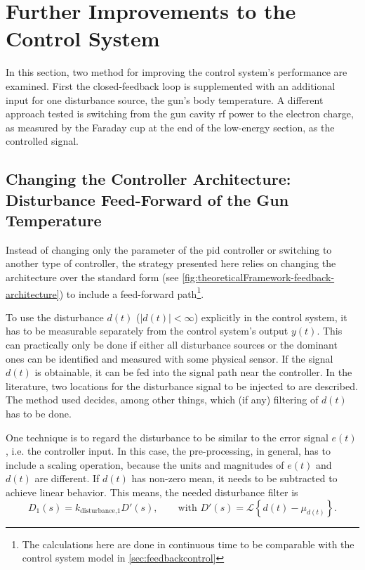 \section{Further Improvements to the Control System}
In this section, two method for improving the control system's performance are examined. First the closed-feedback loop is supplemented with an additional input for one disturbance source, the gun's body temperature. A different approach tested is switching from the gun cavity \gls{rf} power to the electron charge, as measured by the Faraday cup at the end of the low-energy section, as the controlled signal.

\subsection{Changing the Controller Architecture: Disturbance Feed-Forward of the Gun Temperature}
Instead of changing only the parameter of the \gls{pid} controller or switching to another type of controller, the strategy presented here relies on changing the architecture over the standard form (see \autoref{fig:theoreticalFramework-feedback-architecture}) to include a feed-forward path\footnote{The calculations here are done in continuous time to be comparable with the control system model in \autoref{sec:feedbackcontrol}}.

To use the disturbance $d(t)$ ($|d(t)|<\infty$) explicitly in the control system, it has to be measurable separately from the control system's output $y(t)$. This can practically only be done if either all disturbance sources or the dominant ones can be identified and measured with some physical sensor. If the signal $d(t)$ is obtainable, it can be fed into the signal path near the controller. In the literature, two locations for the disturbance signal to be injected to are described. The method used decides, among other things, which (if any) filtering of $d(t)$ has to be done.

One technique is to regard the disturbance to be similar to the error signal $e(t)$, i.e. the controller input. \cite{Brosilow2002} In this case, the pre-processing, in general, has to include a scaling operation, because the units and magnitudes of $e(t)$ and $d(t)$ are different. If $d(t)$ has non-zero mean, it needs to be subtracted to achieve linear behavior. This means, the needed disturbance filter is
\begin{equation}
D_1(s)=k_\text{disturbance,1} D'(s),\qquad \text{with } D'(s)=\mathcal{L}\left\{d(t)-\mu_{d(t)}\right\}.
\end{equation}

